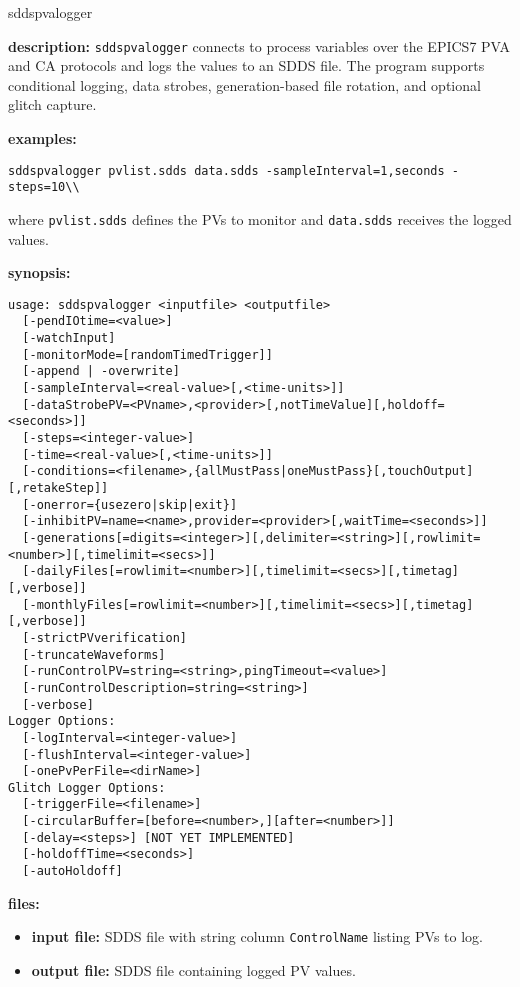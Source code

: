 \begin{sddsprog}{sddspvalogger}
\item \textbf{description:}
\verb+sddspvalogger+ connects to process variables over the EPICS7 PVA and CA protocols and logs the values to an SDDS file. The program supports conditional logging, data strobes, generation-based file rotation, and optional glitch capture.
\item \textbf{examples:}
\begin{verbatim}
sddspvalogger pvlist.sdds data.sdds -sampleInterval=1,seconds -steps=10\\
\end{verbatim}
where {\tt pvlist.sdds} defines the PVs to monitor and {\tt data.sdds} receives the logged values.
\item \textbf{synopsis:}
\begin{verbatim}
usage: sddspvalogger <inputfile> <outputfile>
  [-pendIOtime=<value>]
  [-watchInput]
  [-monitorMode=[randomTimedTrigger]]
  [-append | -overwrite]
  [-sampleInterval=<real-value>[,<time-units>]]
  [-dataStrobePV=<PVname>,<provider>[,notTimeValue][,holdoff=<seconds>]]
  [-steps=<integer-value>]
  [-time=<real-value>[,<time-units>]]
  [-conditions=<filename>,{allMustPass|oneMustPass}[,touchOutput][,retakeStep]]
  [-onerror={usezero|skip|exit}]
  [-inhibitPV=name=<name>,provider=<provider>[,waitTime=<seconds>]]
  [-generations[=digits=<integer>][,delimiter=<string>][,rowlimit=<number>][,timelimit=<secs>]]
  [-dailyFiles[=rowlimit=<number>][,timelimit=<secs>][,timetag][,verbose]]
  [-monthlyFiles[=rowlimit=<number>][,timelimit=<secs>][,timetag][,verbose]]
  [-strictPVverification]
  [-truncateWaveforms]
  [-runControlPV=string=<string>,pingTimeout=<value>]
  [-runControlDescription=string=<string>]
  [-verbose]
Logger Options:
  [-logInterval=<integer-value>]
  [-flushInterval=<integer-value>]
  [-onePvPerFile=<dirName>]
Glitch Logger Options:
  [-triggerFile=<filename>]
  [-circularBuffer=[before=<number>,][after=<number>]]
  [-delay=<steps>] [NOT YET IMPLEMENTED]
  [-holdoffTime=<seconds>]
  [-autoHoldoff]
\end{verbatim}
\item \textbf{files:}
\begin{itemize}
  \item \textbf{input file:} SDDS file with string column \verb|ControlName| listing PVs to log.
  \item \textbf{output file:} SDDS file containing logged PV values.
\end{itemize}


\end{sddsprog}
